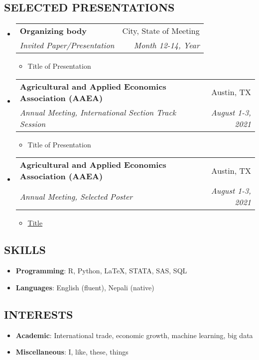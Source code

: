 \documentclass[letterpaper,11pt]{article}
\makeatletter
\newcommand{\ressubheading}[4]{
\begin{tabular*}{6.5in}{l@{\extracolsep{\fill}}r}
		\textbf{#1} & #2 \\
		\textit{#3} & \textit{#4} \\
\end{tabular*}\vspace{-6pt}}
\makeatother
\begin{document}
\subsection*{SELECTED PRESENTATIONS}
\begin{itemize}
\item \ressubheading{Organizing body}{City, State of Meeting}{Invited Paper/Presentation}{Month 12-14, Year}
\begin{itemize}
    \item Title of Presentation 
\end{itemize}


\item \ressubheading{Agricultural and Applied Economics Association (AAEA)}{Austin, TX}{Annual Meeting, International Section Track Session}{August 1-3, 2021}
\begin{itemize}
    \item Title of Presentation 
\end{itemize}
\end{itemize}
\begin{itemize}
\item \ressubheading{Agricultural and Applied Economics Association (AAEA)}{Austin, TX}{Annual Meeting, Selected Poster}{August 1-3, 2021}
\begin{itemize}
    \item \href{link to poster}{Title}
\end{itemize}
\end{itemize}
\vspace{0.1in}
\subsection*{SKILLS}
\begin{itemize}
\item \textbf{Programming}: R,  Python, \LaTeX, STATA, SAS, SQL
\item \textbf{Languages}: English (fluent), Nepali (native)
\end{itemize}

\vspace{0.1in}
\subsection*{INTERESTS}
\begin{itemize}
    \item \textbf{Academic}: International trade, economic growth, machine learning, big data
\item \textbf{Miscellaneous}: I, like, these, things 
\end{itemize}
\end{document}
